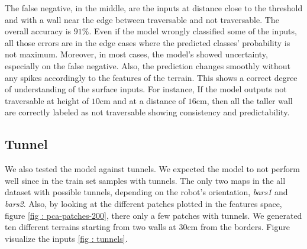 \documentclass[../document.tex]{subfiles}
\begin{document}
The false negative, in the middle, are the inputs at distance close to the threshold and with a wall near the edge between traversable and not traversable. The overall accuracy is $91\%$. Even if the model wrongly classified some of the inputs, all those errors are in the edge cases where the predicted classes' probability is not maximum. Moreover, in most cases, the model's showed uncertainty, especially on the false negative. Also, the prediction changes smoothly without any spikes accordingly to the features of the terrain. This shows a correct degree of understanding of the surface inputs. For instance, If the model outputs not traversable at height of $10$cm and at a distance of $16$cm, then all the taller wall are correctly labeled as not traversable showing consistency and predictability. 
\subsection{Tunnel}
We also tested the model against tunnels. We expected the model to not perform well since in the train set samples with tunnels. The only two maps in the all dataset with possible tunnels, depending on the robot's orientation,  \emph{bars1} and \emph{bars2}. Also, by looking at the different patches plotted in the features space, figure \ref{fig : pca-patches-200}, there only a few patches with tunnels. We generated ten different terrains starting from two walls at $30$cm from the borders. Figure visualize the inputs \ref{fig : tunnels}. 
\end{document}
